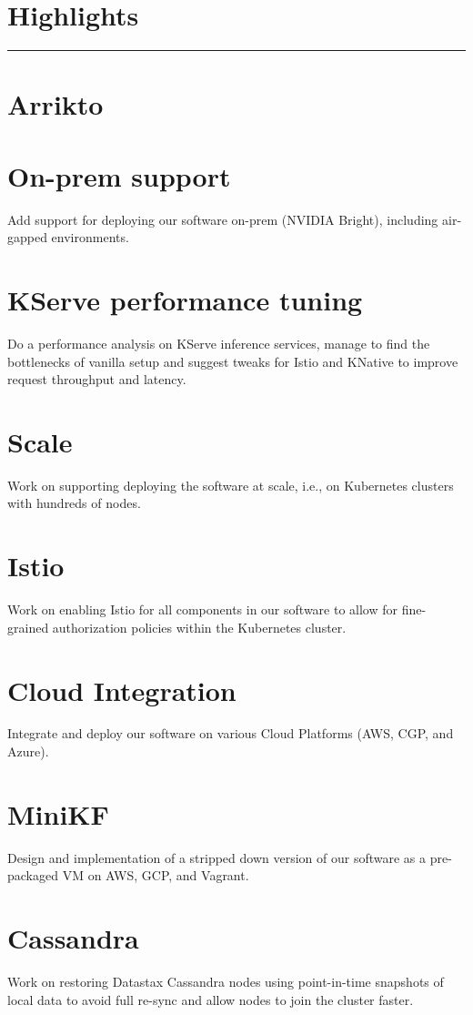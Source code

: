 \documentclass[margin,centered]{res}
\begin{document}
\begin{resume}
\section{Highlights}
\rule[3pt]{\textwidth}{0.4pt}

\section{Arrikto}

\section{\sc On-prem support}
Add support for deploying our software on-prem (NVIDIA Bright), including
air-gapped environments.

\section{\sc KServe performance tuning}
Do a performance analysis on KServe inference services, manage to find the
bottlenecks of vanilla setup and suggest tweaks for Istio and KNative to
improve request throughput and latency.

\section{\sc Scale}
Work on supporting deploying the software at scale, i.e., on Kubernetes
clusters with hundreds of nodes.

\section{\sc Istio}
Work on enabling Istio for all components in our software to allow for
fine-grained authorization policies within the Kubernetes cluster.

\section{\sc Cloud Integration}
Integrate and deploy our software on various Cloud Platforms (AWS, CGP, and
Azure).

\section{\sc MiniKF}
Design and implementation of a stripped down version of our software as a
pre-packaged VM on AWS, GCP, and Vagrant.

\section{\sc Cassandra}
Work on restoring Datastax Cassandra nodes using point-in-time snapshots
of local data to avoid full re-sync and allow nodes to join the cluster faster.


\end{resume}
\end{document}
